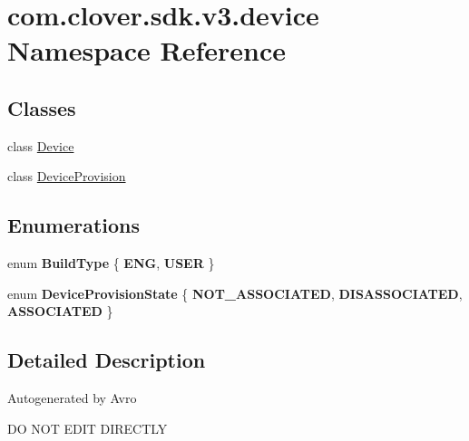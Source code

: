 \hypertarget{namespacecom_1_1clover_1_1sdk_1_1v3_1_1device}{}\section{com.\+clover.\+sdk.\+v3.\+device Namespace Reference}
\label{namespacecom_1_1clover_1_1sdk_1_1v3_1_1device}
\subsection*{Classes}
\begin{DoxyCompactItemize}
\item 
class \hyperlink{classcom_1_1clover_1_1sdk_1_1v3_1_1device_1_1_device}{Device}
\item 
class \hyperlink{classcom_1_1clover_1_1sdk_1_1v3_1_1device_1_1_device_provision}{Device\+Provision}
\end{DoxyCompactItemize}
\subsection*{Enumerations}
\begin{DoxyCompactItemize}
\item 
\mbox{\label{namespacecom_1_1clover_1_1sdk_1_1v3_1_1device_a8dd97d0ddba1e91704a7c44c7d27eb85}} 
enum {\bfseries Build\+Type} \{ {\bfseries E\+NG}, 
{\bfseries U\+S\+ER}
 \}
\item 
\mbox{\label{namespacecom_1_1clover_1_1sdk_1_1v3_1_1device_a91531b18ad063f2ee84a585d774b2d56}} 
enum {\bfseries Device\+Provision\+State} \{ {\bfseries N\+O\+T\+\_\+\+A\+S\+S\+O\+C\+I\+A\+T\+ED}, 
{\bfseries D\+I\+S\+A\+S\+S\+O\+C\+I\+A\+T\+ED}, 
{\bfseries A\+S\+S\+O\+C\+I\+A\+T\+ED}
 \}
\end{DoxyCompactItemize}


\subsection{Detailed Description}
Autogenerated by Avro

DO N\+OT E\+D\+IT D\+I\+R\+E\+C\+T\+LY 